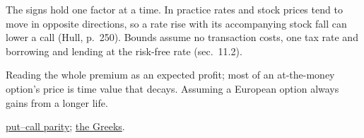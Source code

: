 \begin{qfdefinition}
 The signs hold one factor at a time. In practice rates and stock prices tend to move in opposite directions, so a rate rise with its accompanying stock fall can lower a call (Hull, p.~250). Bounds assume no transaction costs, one tax rate and borrowing and lending at the risk-free rate (sec.~11.2).

 Reading the whole premium as an expected profit; most of an at-the-money option's price is time value that decays. Assuming a European option always gains from a longer life.

 \hyperref[res:put-call-forward-parity]{put--call parity}; \hyperref[meth:greeks-delta-gamma-hedging]{the Greeks}.

\end{qfdefinition}

